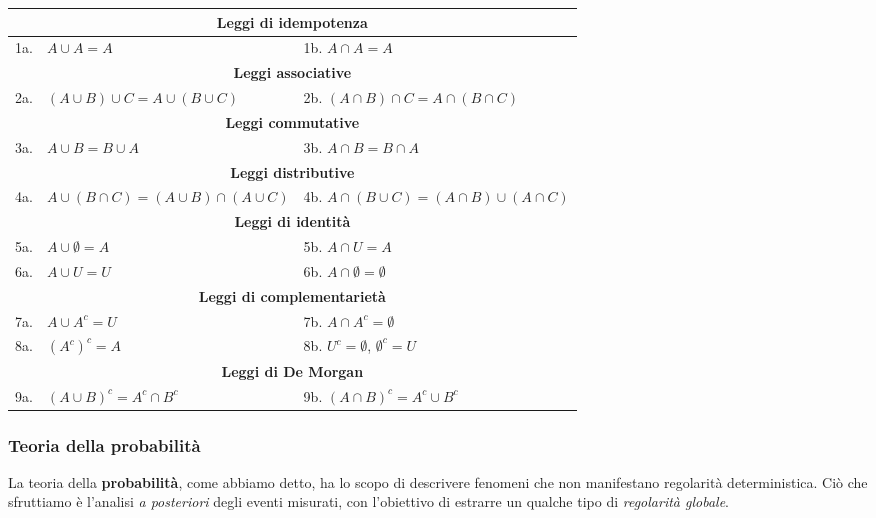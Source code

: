 \documentclass[a4paper,11pt]{article}
\begin{document}
\begin{table}[H]
\centering
\renewcommand{\arraystretch}{1.5}
\begin{tabular}{lll}
\multicolumn{3}{c}{\textbf{Leggi di idempotenza}} \\ \hline
1a. & $A \cup A = A$ & 1b. $A \cap A = A$ \\ 

\multicolumn{3}{c}{\textbf{Leggi associative}} \\ \hline
2a. & $(A \cup B) \cup C = A \cup (B \cup C)$ & 2b. $(A \cap B) \cap C = A \cap (B \cap C)$ \\ 

\multicolumn{3}{c}{\textbf{Leggi commutative}} \\ \hline
3a. & $A \cup B = B \cup A$ & 3b. $A \cap B = B \cap A$ \\ 

\multicolumn{3}{c}{\textbf{Leggi distributive}} \\ \hline
4a. & $A \cup (B \cap C) = (A \cup B) \cap (A \cup C)$ & 4b. $A \cap (B \cup C) = (A \cap B) \cup (A \cap C)$ \\ 

\multicolumn{3}{c}{\textbf{Leggi di identità}} \\ \hline
5a. & $A \cup \emptyset = A$ & 5b. $A \cap U = A$ \\ 
6a. & $A \cup U = U$ & 6b. $A \cap \emptyset = \emptyset$ \\ 

\multicolumn{3}{c}{\textbf{Leggi di complementarietà}} \\ \hline
7a. & $A \cup A^c = U$ & 7b. $A \cap A^c = \emptyset$ \\ 
8a. & $(A^c)^c = A$ & 8b. $U^c = \emptyset$, $\emptyset^c = U$ \\ 

\multicolumn{3}{c}{\textbf{Leggi di De Morgan}} \\ \hline
9a. & $(A \cup B)^c = A^c \cap B^c$ & 9b. $(A \cap B)^c = A^c \cup B^c$ \\ 

\end{tabular}
\end{table}

\subsubsection{Teoria della probabilità}

La teoria della \textbf{probabilità}, come abbiamo detto, ha lo scopo di descrivere fenomeni che non manifestano regolarità deterministica. Ciò che sfruttiamo è l'analisi \textit{a posteriori} degli eventi misurati, con l'obiettivo di estrarre un qualche tipo di \textit{regolarità globale}.
\end{document}
